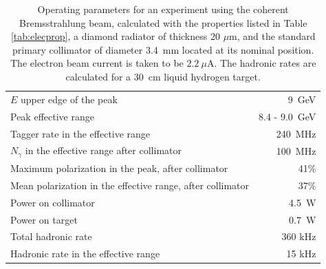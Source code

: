 \begin{table}[ht!]
\begin{center}
\caption[Operating parameters for an experiment]{\label{tab:operates}
Operating parameters for an experiment using the coherent Bremsstrahlung beam,
calculated with the properties
listed in Table \ref{tab:elecprop}, a diamond radiator of thickness 20 $\mu$m, and the standard
primary collimator of diameter 3.4~mm located at its nominal position.
The electron beam current is taken to 
be $2.2~\mu$A. The hadronic rates are calculated for 
a 30~cm liquid hydrogen target.}

\begin{tabular}{|l|r|}
\hline\hline
$E$ upper edge of the peak & 9~GeV \\
Peak effective range       & 8.4 - 9.0~GeV\\
Tagger rate in the effective range & 240~MHz  \\
$N_{\gamma}$ in the effective range after collimator & 100~MHz  \\
Maximum polarization in the peak, after collimator & 41\% \\
Mean polarization in the effective range, after collimator & 37\% \\
Power on collimator & 4.5~W \\
Power on target & 0.7~W \\
Total hadronic rate & 360 kHz \\
Hadronic rate in the effective range & 15 kHz \\
\hline\hline
\end{tabular}
\end{center}
\end{table}


